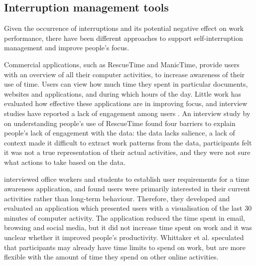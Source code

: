 \subsection{Interruption management tools}
Given the occurrence of interruptions and its potential negative effect on work performance, there have been different approaches to support self-interruption management and improve people's focus. 

Commercial applications, such as RescueTime and ManicTime, provide users with an overview of all their computer activities, to increase awareness of their use of time. Users can view how much time they spent in particular documents, websites and applications, and during which hours of the day. Little work has evaluated how effective these applications are in improving focus, and interview studies have reported a lack of engagement among users \citep{Collins2014, Whittaker2016}. An interview study by \citet{Collins2014} on understanding people’s use of RescueTime found four barriers to explain people’s lack of engagement with the data: the data lacks salience, a lack of context made it difficult to extract work patterns from the data, participants felt it was not a true representation of their actual activities, and they were not sure what actions to take based on the data. 

\citet{Whittaker2016} interviewed office workers and students to establish user requirements for a time awareness application, and found users were primarily interested in their current activities rather than long-term behaviour. Therefore, they developed and evaluated an application which presented users with a visualisation of the last 30 minutes of computer activity. The application reduced the time spent in email, browsing and social media, but it did not increase time spent on work and it was unclear whether it improved people’s productivity. Whittaker et al. speculated that participants may already have time limits to spend on work, but are more flexible with the amount of time they spend on other online activities.

